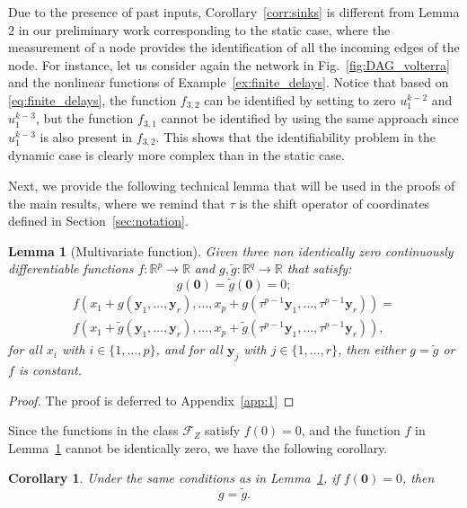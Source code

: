\documentclass[letterpaper,10pt,journal]{IEEEtran}
\newcommand{\Fone}{\mathcal{F}_Z}
\newcommand{\y}{\mathbf{y}}
\newtheorem{corollary}{Corollary}
\newtheorem{lemma}{Lemma}
\newcommand{\R}{\mathbb R}
\newcommand{\zero}{\mathbf{0}}
\begin{document}
Due to the presence of past inputs, Corollary~\ref{corr:sinks} is different from Lemma 2 in our preliminary work \cite{vizuete2023nonlinear} corresponding to the static case, where the measurement of a node provides the identification of all the incoming edges of the node. For instance, let us consider again the network in Fig.~\ref{fig:DAG_volterra} and the nonlinear functions of Example~\ref{ex:finite_delays}. Notice that 
based on \eqref{eq:finite_delays}, the function $f_{3,2}$ can be identified by setting to zero $u_1^{k-2}$ and $u_1^{k-3}$, but the function $f_{3,1}$ cannot be identified by using the same approach since $u_1^{k-3}$ is also present in $f_{3,2}$.
This shows that the identifiability problem in the dynamic case is clearly more complex than in the static case.





Next, we provide the following technical lemma that will be used in the proofs of the main results, where we remind that $\tau$ is the shift operator of coordinates defined in Section~\ref{sec:notation}.

\begin{lemma}[Multivariate function]\label{lemma:multivariate}
Given three non identically zero continuously differentiable functions $f:\R^p\to \R$ and $g,\tilde g:\R^q\to\R$ that satisfy:
$$
g(\zero)=\tilde g(\zero)=0;
$$
\vspace{-7mm}
\begin{multline}\label{eq:equality_multivariate}
f(x_1\!+\!g(\y_1,\ldots,\y_r),\ldots,x_p\!+\!g(\tau^{p-1}\y_1,\ldots,\tau^{p-1}\y_r))=\\     
f(x_1\!+\!\tilde g(\y_1,\ldots,\y_r),\ldots,x_p\!+\!\tilde g(\tau^{p-1}\y_1,\ldots,\tau^{p-1}\y_r)),
\end{multline}
for all $x_i$ with $i\in \{1,\ldots,p\}$, and for all $\y_j$ with $j\in \{1,\ldots,r\}$,
then either $g=\tilde g$ or $f$ is constant.
\end{lemma}
\begin{proof}
    The proof is deferred to Appendix~\ref{app:1}
\end{proof}

Since the functions in the class $\Fone$ satisfy $f(0)=0$, and the function $f$ in Lemma~\ref{lemma:multivariate} cannot be identically zero, we have the following corollary.

\begin{corollary}\label{corr:multivariate}
    Under the same conditions as in Lemma~\ref{lemma:multivariate}, if $f(\zero)=0$, then
    $$
    g=\tilde g.
    $$
\end{corollary}
\end{document}

